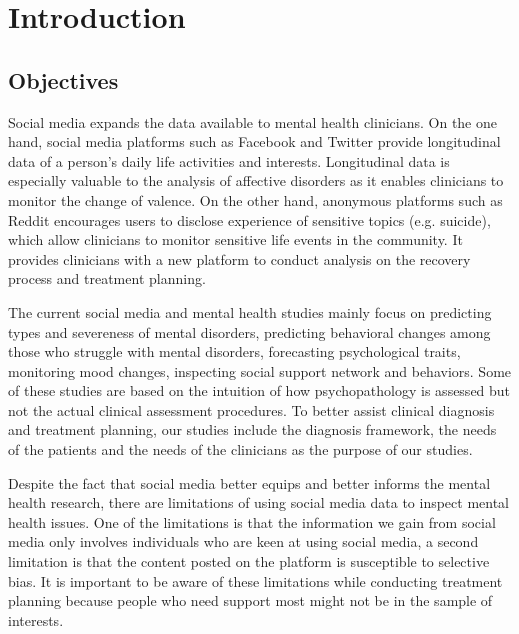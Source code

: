 
\chapter{Introduction}  %
\section{Objectives}
Social media expands the data available to mental health clinicians. On the one hand, social media platforms such as Facebook and Twitter provide longitudinal data of a person's daily life activities and interests. Longitudinal data is especially valuable to the analysis of affective disorders as it enables clinicians to monitor the change of valence. On the other hand, anonymous platforms such as Reddit encourages users to disclose experience of sensitive topics (e.g. suicide), which allow clinicians to monitor sensitive life events in the community. It provides clinicians with a new platform to conduct analysis on the recovery process and treatment planning.

The current social media and mental health studies mainly focus on predicting types and severeness of mental disorders, predicting behavioral changes among those who struggle with mental disorders, forecasting psychological traits, monitoring mood changes, inspecting social support network and behaviors. Some of these studies are based on the intuition of how psychopathology is assessed but not the actual clinical assessment procedures. To better assist clinical diagnosis and treatment planning, our studies include the diagnosis framework, the needs of the patients and the needs of the clinicians as the purpose of our studies. 

Despite the fact that social media better equips and better informs the mental health research, there are limitations of using social media data to inspect mental health issues. One of the limitations is that the information we gain from social media only involves individuals who are keen at using social media, a second limitation is that the content posted on the platform is susceptible to selective bias. It is important to be aware of these limitations while conducting treatment planning because people who need support most might not be in the sample of interests.


